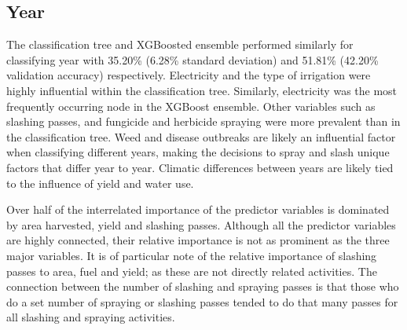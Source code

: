 \documentclass[review,12pt,authoryear]{elsarticle}
\begin{document}
\begin{linenumbers}




 \appendix


 \subsection{Year}

 The classification tree and XGBoosted ensemble performed similarly for classifying year with 35.20\% (6.28\% standard deviation) and 51.81\% (42.20\% validation accuracy) respectively. Electricity and the type of irrigation were highly influential within the classification tree. Similarly, electricity was the most frequently occurring node in the XGBoost ensemble. Other variables such as slashing passes, and fungicide and herbicide spraying were more prevalent than in the classification tree. Weed and disease outbreaks are likely an influential factor when classifying different years, making the decisions to spray and slash unique factors that differ year to year. Climatic differences between years are likely tied to the influence of yield and water use.
 \par
 Over half of the interrelated importance of the predictor variables is dominated by area harvested, yield and slashing passes. Although all the predictor variables are highly connected, their relative importance is not as prominent as the three major variables. It is of particular note of the relative importance of slashing passes to area, fuel and yield; as these are not directly related activities. The connection between the number of slashing and spraying passes is that those who do a set number of spraying or slashing passes tended to do that many passes for all slashing and spraying activities.
 

\end{linenumbers}
\end{document}
